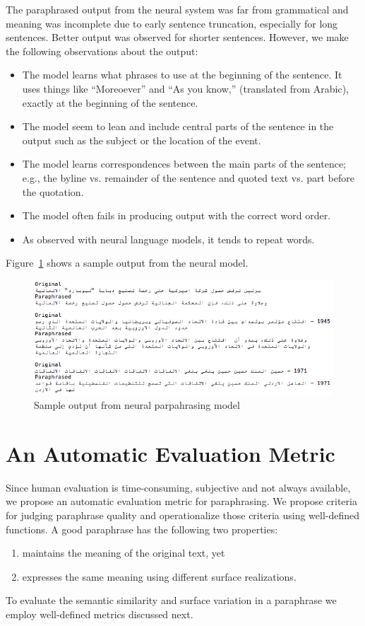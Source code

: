 \documentclass[11pt,letterpaper]{article}
\begin{document}
The paraphrased output from the neural system was far from grammatical and meaning was incomplete due to early sentence truncation, especially for long sentences. Better output was observed for shorter sentences. However, we make the following observations about the output:
\begin{itemize}
\item The model learns what phrases to use at the beginning of the sentence. It uses things like ``Moreoever'' and ``As you know,'' (translated from Arabic), exactly at the beginning of the sentence.
\item The model seem to lean and include central parts of the sentence in the output such as the subject or the location of the event.
\item The model learns correspondences between  the main parts of the sentence; e.g., the byline vs. remainder of the sentence and quoted text vs. part before the quotation.
\item The model often fails in producing output with the correct word order. 
\item  As observed with neural language models, it tends to repeat words. 
\end{itemize}
Figure~\ref{sample2} shows a sample output from the neural model.
\begin{figure}
\center
\includegraphics[width=\textwidth]{sampleoutput.jpg}
\caption{Sample output from neural parpahrasing model}
\label{sample2}
\end{figure}

\section{An Automatic Evaluation Metric}
\label{eval}
Since human evaluation is time-consuming, subjective and not always available, we propose an automatic evaluation metric for paraphrasing. We propose criteria for judging paraphrase quality and operationalize those criteria using well-defined functions. A good paraphrase has the following two properties:
\begin{enumerate}
\item maintains the meaning of the original text, yet
\item expresses the same meaning using different surface realizations.
\end{enumerate}
To evaluate the semantic similarity and surface variation in a paraphrase we employ well-defined metrics discussed next.
\end{document}
